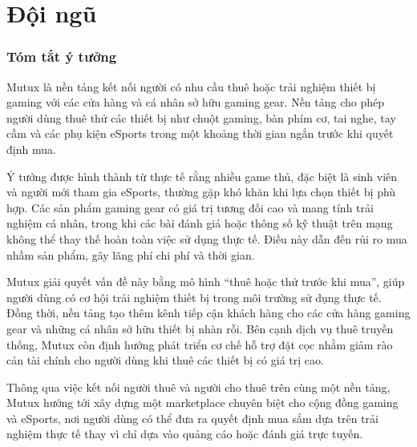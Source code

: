 \part{Đội ngũ}

\section{Tóm tắt ý tưởng}

Mutux là nền tảng kết nối người có nhu cầu thuê hoặc trải nghiệm thiết bị gaming với các cửa hàng và cá nhân sở hữu gaming gear. Nền tảng cho phép người dùng thuê thử các thiết bị như chuột gaming, bàn phím cơ, tai nghe, tay cầm và các phụ kiện eSports trong một khoảng thời gian ngắn trước khi quyết định mua.

Ý tưởng được hình thành từ thực tế rằng nhiều game thủ, đặc biệt là sinh viên và người mới tham gia eSports, thường gặp khó khăn khi lựa chọn thiết bị phù hợp. Các sản phẩm gaming gear có giá trị tương đối cao và mang tính trải nghiệm cá nhân, trong khi các bài đánh giá hoặc thông số kỹ thuật trên mạng không thể thay thế hoàn toàn việc sử dụng thực tế. Điều này dẫn đến rủi ro mua nhầm sản phẩm, gây lãng phí chi phí và thời gian.

Mutux giải quyết vấn đề này bằng mô hình “thuê hoặc thử trước khi mua”, giúp người dùng có cơ hội trải nghiệm thiết bị trong môi trường sử dụng thực tế. Đồng thời, nền tảng tạo thêm kênh tiếp cận khách hàng cho các cửa hàng gaming gear và những cá nhân sở hữu thiết bị nhàn rỗi. Bên cạnh dịch vụ thuê truyền thống, Mutux còn định hướng phát triển cơ chế hỗ trợ đặt cọc nhằm giảm rào cản tài chính cho người dùng khi thuê các thiết bị có giá trị cao.

Thông qua việc kết nối người thuê và người cho thuê trên cùng một nền tảng, Mutux hướng tới xây dựng một marketplace chuyên biệt cho cộng đồng gaming và eSports, nơi người dùng có thể đưa ra quyết định mua sắm dựa trên trải nghiệm thực tế thay vì chỉ dựa vào quảng cáo hoặc đánh giá trực tuyến.
